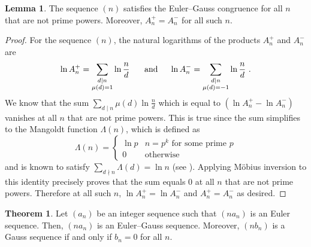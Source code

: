 \documentclass{article}
\numberwithin{equation}{section}
\theoremstyle{definition}
\newtheorem{lemma}[definition]{\bf {Lemma}}
\newtheorem{theorem}[definition]{\bf {Theorem}}
\begin{document}
\begin{lemma}\label{lem:03}
    The sequence $(n)$ satisfies the Euler--Gauss congruence for all $n$ that are not prime powers. Moreover, $A_n^+ =A_n^-$ for all such $n$. 
\end{lemma}
\begin{proof}
    For the sequence $(n)$, the natural logarithms of the products $A_n^+$ and $A_n^-$ are
    \[\ln{A_n^+}=\sum_{\substack{d\mid n\\\mu(d)=1}}\ln{\frac{n}{d}}\text{\hspace{5mm} and\hspace{5mm}}\ln{A_n^-}=\sum_{\substack{d\mid n\\\mu(d)=-1}}\ln{\frac{n}{d}}\text{ .}\]
    We know that the sum $\sum_{d\mid n}\mu(d)\ln{\frac{n}{d}}$ which is equal to $(\ln{A_n^+}-\ln{A_n^-})$ vanishes at all $n$ that are not prime powers. This is true since the sum simplifies to the Mangoldt function $\Lambda(n)$, which is defined as
    \[\Lambda(n)=\begin{cases}
        \ln{p}&n=p^k\text{ for some prime }p\\0&\text{otherwise} 
    \end{cases}\]
    and is known to satisfy $\sum_{d\nmid n}\Lambda(d)=\ln{n}$ (see \cite[Chapter 2]{antapostol}). Applying M\"{o}bius inversion to this identity precisely proves that the sum equals $0$ at all $n$ that are not prime powers. 
    Therefore at all such $n$, $\ln{A_n^+}=\ln{A_n^-}$ and $A_n^+=A_n^-$ as desired. 
\end{proof}
\begin{theorem}\label{thm:6}
    Let $(a_n)$ be an integer sequence such that $(na_n)$ is an Euler sequence. Then, $(na_n)$ is an Euler--Gauss sequence. Moreover, $(nb_n)$ is a Gauss sequence if and only if $b_{n} =0$ for all $n$. 
\end{theorem}
\end{document}
